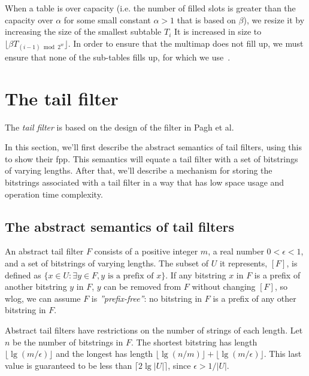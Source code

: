 \documentclass[11pt,letterpaper]{article}
\begin{document}
When a table is over capacity (i.e. the number of filled slots is greater than the capacity over $\alpha$ for some small constant $\alpha > 1$ that is based on $\beta$), we resize it by increasing the size of the smallest subtable $T_i$
It is increased in size to $\lfloor \beta T_{(i-1) \bmod 2^w} \rfloor$.
In order to ensure that the multimap does not fill up, we must ensure that none of the sub-tables fills up, for which we use~\cite{raab1998balls}.

\section{The tail filter}

The {\em tail filter} is based on the design of the filter in Pagh et al.~\cite{DBLP:journals/corr/abs-1304-1188}

In this section, we'll first describe the abstract semantics of tail filters, using this to show their fpp.
This semantics will equate a tail filter with a set of bitstrings of varying lengths.
After that, we'll describe a mechanism for storing the bitstrings associated with a tail filter in a way that has low space usage and operation time complexity.

\subsection{The abstract semantics of tail filters}

An abstract tail filter $F$ consists of a positive integer $m$, a real number $0 < \epsilon < 1$, and a set of bitstrings of varying lengths. %
The subset of $U$ it represents, $[F]$, is defined as $\{x \in U : \exists y \in F, y \textrm{ is a prefix of } x\}$.
If any bitstring $x$ in $F$ is a prefix of another bitstring $y$ in $F$, $y$ can be removed from $F$ without changing $[F]$, so wlog, we can assume $F$ is {\em ''prefix-free''}: no bitstring in $F$ is a prefix of any other bitstring in $F$.


Abstract tail filters have restrictions on the number of strings of each length.
Let $n$ be the number of bitstrings in $F$.
The shortest bitstring has length $\lfloor \lg (m / \epsilon) \rfloor$ and the longest has length $\lfloor \lg (n/m) \rfloor + \lfloor \lg (m / \epsilon) \rfloor$.
This last value is guaranteed to be less than $\lceil 2 \lg |U| \rceil$, since $\epsilon > 1/|U|$.
\end{document}
